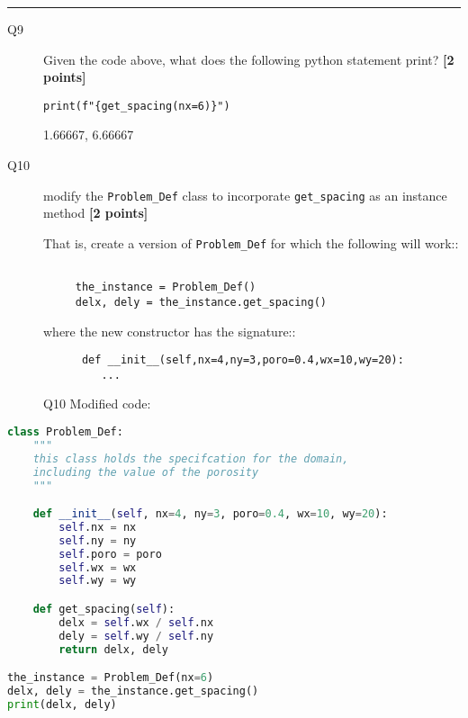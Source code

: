 \documentclass{article}
\newcommand{\ans}[1]{\textcolor{dark-green}{#1}}
\begin{document}
\rule{15cm}{0.75pt}

\begin{description}

\item[Q9] Given the code above, what does the following python statement print?
  \textbf{[2 points]}
  
\verb+print(f"{get_spacing(nx=6)}")+

\ans{1.66667, 6.66667}
  
\end{description}


\begin{description}  

  
\item[Q10] modify the \verb+Problem_Def+ class to
  incorporate \verb+get_spacing+ as an instance method \textbf{[2 points]}

  That is, create a version of \verb+Problem_Def+ for which the following will work::

\begin{verbatim}

     the_instance = Problem_Def()
     delx, dely = the_instance.get_spacing()

\end{verbatim}

where the new constructor has the signature::

\begin{verbatim}
      def __init__(self,nx=4,ny=3,poro=0.4,wx=10,wy=20):
         ...
\end{verbatim}

\newpage
\ans{Q10 Modified code:}
  
\end{description}  

\begin{lstlisting}[language=Python]
class Problem_Def:
    """
    this class holds the specifcation for the domain,
    including the value of the porosity
    """

    def __init__(self, nx=4, ny=3, poro=0.4, wx=10, wy=20):
        self.nx = nx
        self.ny = ny
        self.poro = poro
        self.wx = wx
        self.wy = wy

    def get_spacing(self):
        delx = self.wx / self.nx
        dely = self.wy / self.ny
        return delx, dely

the_instance = Problem_Def(nx=6)
delx, dely = the_instance.get_spacing()
print(delx, dely)

  
\end{lstlisting}  
\end{document}

